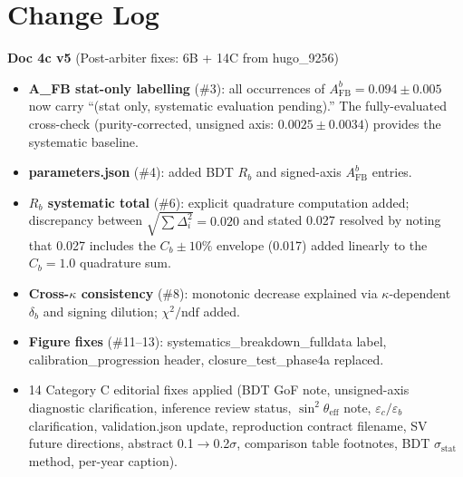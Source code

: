 \documentclass[11pt,a4paper]{article}
\begin{document}
\tableofcontents
\clearpage

\section*{Change Log}

\textbf{Doc 4c v5} (Post-arbiter fixes: 6B + 14C from hugo\_9256)
\begin{itemize}
\item \textbf{A\_FB stat-only labelling} (\#3): all occurrences of $A_\text{FB}^b = 0.094 \pm 0.005$
  now carry ``(stat only, systematic evaluation pending).''
  The fully-evaluated cross-check (purity-corrected, unsigned axis: $0.0025 \pm 0.0034$) provides
  the systematic baseline.
\item \textbf{parameters.json} (\#4): added BDT $R_b$ and signed-axis $A_\text{FB}^b$ entries.
\item \textbf{$R_b$ systematic total} (\#6): explicit quadrature computation added;
  discrepancy between $\sqrt{\sum \Delta_i^2} = 0.020$ and stated 0.027 resolved
  by noting that 0.027 includes the $C_b \pm 10\%$ envelope (0.017) added linearly
  to the $C_b = 1.0$ quadrature sum.
\item \textbf{Cross-$\kappa$ consistency} (\#8): monotonic decrease explained via
  $\kappa$-dependent $\delta_b$ and signing dilution; $\chi^2/\text{ndf}$ added.
\item \textbf{Figure fixes} (\#11--13): systematics\_breakdown\_fulldata label,
  calibration\_progression header, closure\_test\_phase4a replaced.
\item 14 Category C editorial fixes applied (BDT GoF note, unsigned-axis diagnostic
  clarification, inference review status, $\sin^2\theta_\text{eff}$ note,
  $\varepsilon_c/\varepsilon_b$ clarification, validation.json update,
  reproduction contract filename, SV future directions, abstract 0.1$\to$0.2$\sigma$,
  comparison table footnotes, BDT $\sigma_\text{stat}$ method, per-year caption).
\end{itemize}
\end{document}
